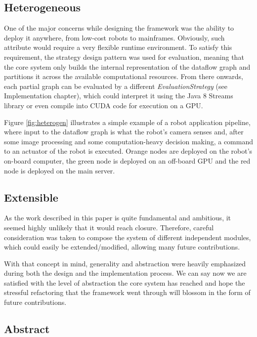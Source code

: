 \documentclass[sigplan,review,anonymous]{acmart}\settopmatter{printfolios=true}
\begin{document}

\subsection{Heterogeneous}

One of the major concerns while designing the framework was the ability to deploy it anywhere, from low-cost robots to mainframes. Obviously, such attribute would require a very flexible runtime environment. To satisfy this requirement, the strategy design pattern was used for evaluation, meaning that the core system only builds the internal representation of the dataflow graph and partitions it across the available computational resources. From there onwards, each partial graph can be evaluated by a different \textit{EvaluationStrategy} (see Implementation chapter), which could interpret it using the Java 8 Streams library\cite{java_streams} or even compile into CUDA code for execution on a GPU.

Figure \ref{fig:heterogen} illustrates a simple example of a robot application pipeline, where input to the dataflow graph is what the robot's camera senses and, after some image processing and some computation-heavy decision making, a command to an actuator of the robot is executed. Orange nodes are deployed on the robot's on-board computer, the green node is deployed on an off-board GPU and the red node is deployed on the main server.


\subsection{Extensible}

As the work described in this paper is quite fundamental and ambitious, it seemed highly unlikely that it would reach closure. Therefore, careful consideration was taken to compose the system of different independent modules, which could easily be extended/modified, allowing many future contributions.

With that concept in mind, generality and abstraction were heavily emphasized during both the design and the implementation process. We can say now we are satisfied with the level of abstraction the core system has reached and hope the stressful refactoring that the framework went through will blossom in the form of future contributions.

\subsection{Abstract}
\end{document}
